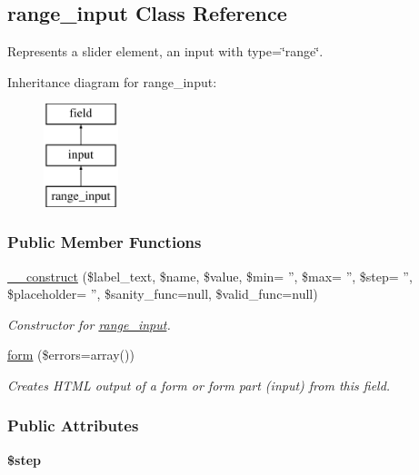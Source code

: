 \hypertarget{classrange__input}{\subsection{range\-\_\-input Class Reference}
\label{classrange__input}
}


Represents a slider element, an input with type=\char`\"{}range\char`\"{}.  


Inheritance diagram for range\-\_\-input\-:\begin{figure}[H]
\begin{center}
\leavevmode
\includegraphics[height=3.000000cm]{classrange__input}
\end{center}
\end{figure}
\subsubsection*{Public Member Functions}
\begin{DoxyCompactItemize}
\item 
\hyperlink{classrange__input_a0d8240e99521fbde9c3dcd95da8aea1c}{\-\_\-\-\_\-construct} (\$label\-\_\-text, \$name, \$value, \$min= '', \$max= '', \$step= '', \$placeholder= '', \$sanity\-\_\-func=null, \$valid\-\_\-func=null)
\begin{DoxyCompactList}\small\item\em Constructor for \hyperlink{classrange__input}{range\-\_\-input}. \end{DoxyCompactList}\item 
\hyperlink{classrange__input_a84223d881e2c9279e6ca69c4957bf53e}{form} (\$errors=array())
\begin{DoxyCompactList}\small\item\em Creates H\-T\-M\-L output of a form or form part (input) from this field. \end{DoxyCompactList}\end{DoxyCompactItemize}
\subsubsection*{Public Attributes}
\begin{DoxyCompactItemize}
\item 
\hypertarget{classrange__input_ad5a0fe009154b6827fa0cb0ab2bec839}{{\bfseries \$step}}\label{classrange__input_ad5a0fe009154b6827fa0cb0ab2bec839}

\end{DoxyCompactItemize}


